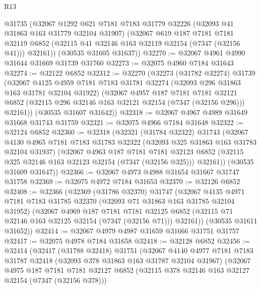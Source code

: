 \begin{lexlean}{R13}
\begin{coremodule}
      @31735
      (@32067
        @1292
        @621
        @7181
        @7183
        @31779
        @32226
        (@32093 @41 @31863 @163 @31779 @32104 @31907)
        (@32067
          @619
          @187
          @7181
          @7181
          @32119
          @6852
          (@32115 @41 @32146 @163 @32119 @32154 (@7347 (@32156 @41)))
          @32161))
      (@30535 @31605 @31637))
@32270 := @32067 @4961 @4990 @31644 @31669 @31739 @31760
@32273 := @32075 @4960 @7184 @31643
@32274 := @32122 @6852
@32312 := @32270
    (@32273
      (@31782 @32274)
      @31739
      (@32067
        @4125
        @4959
        @7181
        @7183
        @31781
        @32274
        (@32093 @296 @31863 @163 @31781 @32104 @31922)
        (@32067
          @4957
          @187
          @7181
          @7181
          @32121
          @6852
          (@32115 @296 @32146 @163 @32121 @32154 (@7347 (@32156 @296)))
          @32161))
      (@30535 @31607 @31642))
@32318 := @32067 @4967 @4989 @31649 @31668 @31743 @31759
@32321 := @32075 @4966 @7184 @31648
@32322 := @32124 @6852
@32360 := @32318
    (@32321
      (@31784 @32322)
      @31743
      (@32067
        @4130
        @4965
        @7181
        @7183
        @31783
        @32322
        (@32093 @325 @31863 @163 @31783 @32104 @31937)
        (@32067
          @4963
          @187
          @7181
          @7181
          @32123
          @6852
          (@32115 @325 @32146 @163 @32123 @32154 (@7347 (@32156 @325)))
          @32161))
      (@30535 @31609 @31647))
@32366 := @32067 @4973 @4988 @31654 @31667 @31747 @31758
@32369 := @32075 @4972 @7184 @31653
@32370 := @32126 @6852
@32408 := @32366
    (@32369
      (@31786 @32370)
      @31747
      (@32067
        @4135
        @4971
        @7181
        @7183
        @31785
        @32370
        (@32093 @71 @31863 @163 @31785 @32104 @31952)
        (@32067
          @4969
          @187
          @7181
          @7181
          @32125
          @6852
          (@32115 @71 @32146 @163 @32125 @32154 (@7347 (@32156 @71)))
          @32161))
      (@30535 @31611 @31652))
@32414 := @32067 @4979 @4987 @31659 @31666 @31751 @31757
@32417 := @32075 @4978 @7184 @31658
@32418 := @32128 @6852
@32456 := @32414
    (@32417
      (@31788 @32418)
      @31751
      (@32067
        @4140
        @4977
        @7181
        @7183
        @31787
        @32418
        (@32093 @378 @31863 @163 @31787 @32104 @31967)
        (@32067
          @4975
          @187
          @7181
          @7181
          @32127
          @6852
          (@32115 @378 @32146 @163 @32127 @32154 (@7347 (@32156 @378)))

\end{coremodule}
\end{lexlean}
